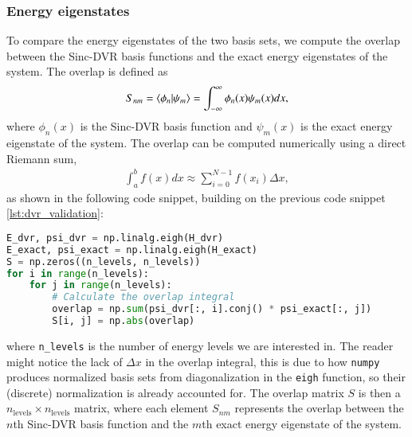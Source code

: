 \documentclass{subfiles}
\begin{document}
\subsubsection*{Energy eigenstates}
To compare the energy eigenstates of the two basis sets, we compute the overlap between the Sinc-DVR basis functions and the exact energy eigenstates of the system. The overlap is defined as
\begin{align*}
    S_{nm} = \braket{\phi_n|\psi_m} = \int_{-\infty}^{\infty} \phi_n(x) \psi_m(x) dx,
\end{align*}
where $\phi_n(x)$ is the Sinc-DVR basis function and $\psi_m(x)$ is the exact energy eigenstate of the system. The overlap can be computed numerically using a direct Riemann sum,
\begin{align*}
    \int_a^b f(x) dx \approx \sum_{i=0}^{N-1} f(x_i) \Delta x, 
\end{align*} 
as shown in the following code snippet, building on the previous code snippet \ref{lst:dvr_validation}:
\begin{lstlisting}[language=Python]
E_dvr, psi_dvr = np.linalg.eigh(H_dvr)
E_exact, psi_exact = np.linalg.eigh(H_exact)
S = np.zeros((n_levels, n_levels))
for i in range(n_levels):
    for j in range(n_levels):
        # Calculate the overlap integral
        overlap = np.sum(psi_dvr[:, i].conj() * psi_exact[:, j])
        S[i, j] = np.abs(overlap)
\end{lstlisting}
where \texttt{n\_levels} is the number of energy levels we are interested in. The reader might notice the lack of $\Delta x$ in the overlap integral, this is due to how \texttt{numpy} produces normalized basis sets from diagonalization in the \texttt{eigh} function, so their (discrete) normalization is already accounted for. The overlap matrix $S$ is then a $n_{\text{levels}} \times n_{\text{levels}}$ matrix, where each element $S_{nm}$ represents the overlap between the $n$th Sinc-DVR basis function and the $m$th exact energy eigenstate of the system.
\end{document}
